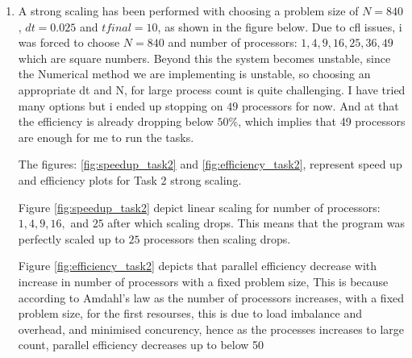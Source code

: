 \documentclass[12pt,a4paper]{article}
\begin{document}
\begin{enumerate}
		\item A strong scaling has been performed with choosing a problem size of $N = 840$, $dt = 0.025$ and $tfinal =10$, as shown in the figure below. Due to cfl issues, i was forced to choose $N = 840$  and number of processors: $1 , 4, 9, 16, 25, 36, 49$ which are square numbers. Beyond this the system becomes unstable, since the Numerical method we are implementing is unstable, so choosing an appropriate dt and N, for large process count is quite challenging. I have tried many options but i ended up stopping on $49$ processors for now. And at that the efficiency is already dropping below $50$\%, which implies that 49 processors are enough for me to run the tasks.
		
		  The figures: \ref{fig:speedup_task2} and \ref{fig:efficiency_task2}, represent speed up and efficiency plots for Task 2 strong scaling. 
		
		Figure \ref{fig:speedup_task2} depict linear scaling for number of processors:$ 1, 4, 9, 16, $ and $25$ after which scaling drops. This means that the program was perfectly scaled up to $25$ processors then scaling drops.
		
		Figure \ref{fig:efficiency_task2} depicts that parallel efficiency decrease with increase in number of processors with a fixed problem size, This is because according to Amdahl's law as the number of processors increases, with a fixed problem size,  for the first resourses, this is due to  load imbalance and overhead, and minimised concurency, hence as the processes increases to large count, parallel efficiency decreases up to below 50%
		

\end{enumerate}
\end{document}
